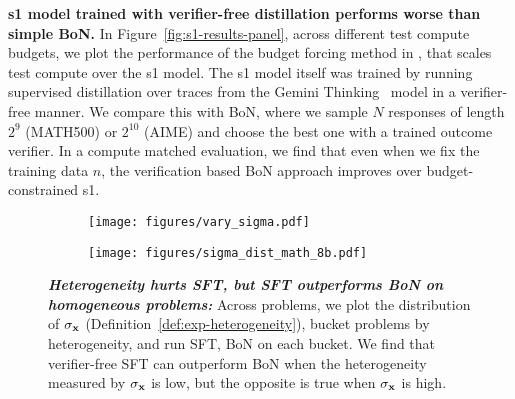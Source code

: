 \textbf{s1 model trained with verifier-free distillation performs worse than simple BoN.} In Figure~\ref{fig:s1-results-panel}, across different test compute budgets, we plot the performance of the budget forcing method in \citet{muennighoff2025s1}, that scales test compute over the s1 model. The s1 model itself was trained by running supervised distillation over traces from the Gemini Thinking~\cite{geminithinking} model in a verifier-free manner. We compare this with BoN, where we sample $N$ responses of length $2^9$ (MATH500) or $2^{10}$ (AIME) and choose the best one with a trained outcome verifier. In a compute matched evaluation, we find that even when we fix the training data $n$, the verification based BoN approach improves over budget-constrained s1. 
\begin{figure}[!h]
    \centering
    \begin{subfigure}{0.35\linewidth}
        \centering
        \texttt{[image: figures/vary\_sigma.pdf]}
    \end{subfigure}
    \begin{subfigure}{0.35\linewidth}
        \centering
        \texttt{[image: figures/sigma\_dist\_math\_8b.pdf]}
    \end{subfigure}
    \vspace{-0.1cm}
    \caption{\footnotesize{\textbf{\emph{Heterogeneity hurts SFT, but SFT outperforms BoN on homogeneous problems:}} Across  problems, we plot the distribution of $\sigma_{\mathbf{x}}$ (Definition~\ref{def:exp-heterogeneity}), bucket problems by heterogeneity, and run SFT, BoN on each bucket. We find that verifier-free SFT can outperform BoN when the heterogeneity measured by  $\sigma_{\mathbf{x}}$ is low, but the opposite is true when $\sigma_{\mathbf{x}}$ is high.
    \vspace{-0.25cm}
    }}
    \label{fig:sigma-dist-math}
\end{figure}

